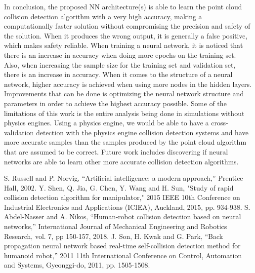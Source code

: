 \documentclass[conference]{IEEEtran}
\begin{document}
In conclusion, the proposed NN architecture(s) is able to learn the point cloud collision detection algorithm with a very high accuracy, making a computationally faster solution without compromising the precision and safety of the solution. When it produces the wrong output, it is generally a false positive, which makes safety reliable. When training a neural network, it is noticed that there is an increase in accuracy when doing more epochs on the training set. Also, when increasing the sample size for the training set and validation set, there is an increase in accuracy.  When it comes to the structure of a neural network, higher accuracy is achieved when using more nodes in the hidden layers. Improvements that can be done is optimizing the neural network structure and parameters in order to achieve the highest accuracy possible. Some of the limitations of this work is the entire analysis being done in simulations without physics engines. Using a physics engine, we would be able to have a cross-validation detection with the physics engine collision detection systems and have more accurate samples than the samples produced by the point cloud algorithm that are assumed to be correct. Future work includes discovering if neural networks are able to learn other more accurate collision detection algorithms.


\begin{thebibliography}{00}
 S. Russell and P. Norvig, ``Artificial intelligence: a modern approach,'' Prentice Hall, 2002.
 Y. Shen, Q. Jia, G. Chen, Y. Wang and H. Sun, "Study of rapid collision detection algorithm for manipulator," 2015 IEEE 10th Conference on Industrial Electronics and Applications (ICIEA), Auckland, 2015, pp. 934-938.
 S. Abdel-Nasser and A. Nikos, ``Human-robot collision detection based on neural networks,'' International Journal of Mechanical Engineering and Robotics Research, vol. 7, pp 150-157, 2018.
 J. Son, H. Kwak and G. Park, ``Back propagation neural network based real-time self-collision detection method for humanoid robot,'' 2011 11th International Conference on Control, Automation and Systems, Gyeonggi-do, 2011, pp. 1505-1508.
\end{thebibliography}
\end{document}
